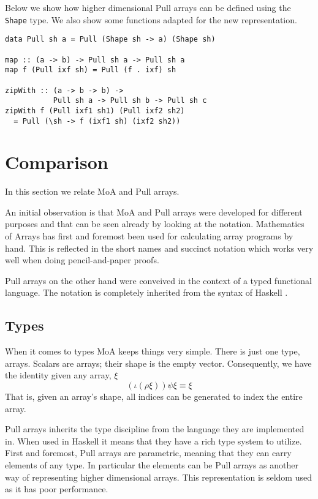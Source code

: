 \documentclass{sigplanconf}
\begin{document}
Below we show how higher dimensional Pull arrays can be defined using
the \verb!Shape! type. We also show some functions adapted for the new
representation.
\begin{verbatim}
data Pull sh a = Pull (Shape sh -> a) (Shape sh)

map :: (a -> b) -> Pull sh a -> Pull sh a
map f (Pull ixf sh) = Pull (f . ixf) sh

zipWith :: (a -> b -> b) -> 
           Pull sh a -> Pull sh b -> Pull sh c
zipWith f (Pull ixf1 sh1) (Pull ixf2 sh2)
  = Pull (\sh -> f (ixf1 sh) (ixf2 sh2))
\end{verbatim}


\section{Comparison}

In this section we relate MoA and Pull arrays. 

An initial observation is that MoA and Pull arrays were developed for
different purposes and that can be seen already by looking at the
notation. Mathematics of Arrays has first and foremost been used for
calculating array programs by hand. This is reflected in the short
names and succinct notation which works very well when doing
pencil-and-paper proofs.

Pull arrays on the other hand were conveived in the context of a
typed functional language. The notation is completely inherited from
the syntax of Haskell \cite{marlow2010haskell}.

\subsection{Types}
\label{sec:types}

When it comes to types MoA keeps things very simple. There is just one
type, arrays.  Scalars are arrays;  their shape is the empty vector. Consequently, we have the identity given any array, $\xi$
\[( \iota (\rho \xi)  )\psi \xi \equiv \xi\]
That is, given an array's shape, all indices can be generated to index the entire array.

Pull arrays inherits the type discipline from the language they are
implemented in. When used in Haskell it means that they have a rich
type system to utilize. First and foremost, Pull arrays are
parametric, meaning that they can carry elements of any type. In
particular the elements can be Pull arrays as another way of
representing higher dimensional arrays. This representation is seldom
used as it has poor performance.
\end{document}

